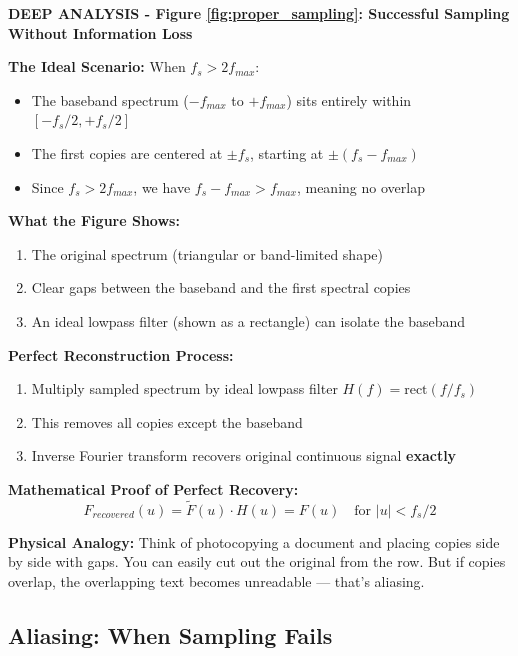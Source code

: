 \documentclass[12pt,a4paper]{article}
\begin{document}
\begin{deepexplanation}
\textbf{DEEP ANALYSIS - Figure \ref{fig:proper_sampling}: Successful Sampling Without Information Loss}

\textbf{The Ideal Scenario:}
When $f_s > 2f_{max}$:
\begin{itemize}
    \item The baseband spectrum ($-f_{max}$ to $+f_{max}$) sits entirely within $[-f_s/2, +f_s/2]$
    \item The first copies are centered at $\pm f_s$, starting at $\pm(f_s - f_{max})$
    \item Since $f_s > 2f_{max}$, we have $f_s - f_{max} > f_{max}$, meaning no overlap
\end{itemize}

\textbf{What the Figure Shows:}
\begin{enumerate}
    \item The original spectrum (triangular or band-limited shape)
    \item Clear gaps between the baseband and the first spectral copies
    \item An ideal lowpass filter (shown as a rectangle) can isolate the baseband
\end{enumerate}

\textbf{Perfect Reconstruction Process:}
\begin{enumerate}
    \item Multiply sampled spectrum by ideal lowpass filter $H(f) = \text{rect}(f/f_s)$
    \item This removes all copies except the baseband
    \item Inverse Fourier transform recovers original continuous signal \textbf{exactly}
\end{enumerate}

\textbf{Mathematical Proof of Perfect Recovery:}
\[
F_{recovered}(u) = \tilde{F}(u) \cdot H(u) = F(u) \quad \text{for } |u| < f_s/2
\]

\textbf{Physical Analogy:}
Think of photocopying a document and placing copies side by side with gaps. You can easily cut out the original from the row. But if copies overlap, the overlapping text becomes unreadable --- that's aliasing.
\end{deepexplanation}

\subsection{Aliasing: When Sampling Fails}
\end{document}
